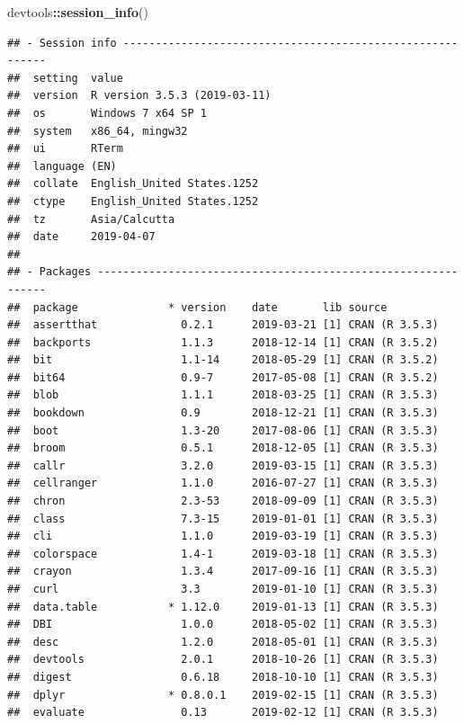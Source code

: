 \documentclass[12pt,openany]{book}
\newenvironment{Shaded}{\begin{snugshade}}{\end{snugshade}}
\newcommand{\KeywordTok}[1]{\textcolor[rgb]{0.13,0.29,0.53}{\textbf{#1}}}
\newcommand{\NormalTok}[1]{#1}
\newcommand{\OperatorTok}[1]{\textcolor[rgb]{0.81,0.36,0.00}{\textbf{#1}}}
\begin{document}
\begin{Shaded}
\begin{Highlighting}[]
\NormalTok{devtools}\OperatorTok{::}\KeywordTok{session_info}\NormalTok{()}
\end{Highlighting}
\end{Shaded}

\begin{verbatim}
## - Session info ----------------------------------------------------------
##  setting  value                       
##  version  R version 3.5.3 (2019-03-11)
##  os       Windows 7 x64 SP 1          
##  system   x86_64, mingw32             
##  ui       RTerm                       
##  language (EN)                        
##  collate  English_United States.1252  
##  ctype    English_United States.1252  
##  tz       Asia/Calcutta               
##  date     2019-04-07                  
## 
## - Packages --------------------------------------------------------------
##  package              * version    date       lib source        
##  assertthat             0.2.1      2019-03-21 [1] CRAN (R 3.5.3)
##  backports              1.1.3      2018-12-14 [1] CRAN (R 3.5.2)
##  bit                    1.1-14     2018-05-29 [1] CRAN (R 3.5.2)
##  bit64                  0.9-7      2017-05-08 [1] CRAN (R 3.5.2)
##  blob                   1.1.1      2018-03-25 [1] CRAN (R 3.5.3)
##  bookdown               0.9        2018-12-21 [1] CRAN (R 3.5.3)
##  boot                   1.3-20     2017-08-06 [1] CRAN (R 3.5.3)
##  broom                  0.5.1      2018-12-05 [1] CRAN (R 3.5.3)
##  callr                  3.2.0      2019-03-15 [1] CRAN (R 3.5.3)
##  cellranger             1.1.0      2016-07-27 [1] CRAN (R 3.5.3)
##  chron                  2.3-53     2018-09-09 [1] CRAN (R 3.5.3)
##  class                  7.3-15     2019-01-01 [1] CRAN (R 3.5.3)
##  cli                    1.1.0      2019-03-19 [1] CRAN (R 3.5.3)
##  colorspace             1.4-1      2019-03-18 [1] CRAN (R 3.5.3)
##  crayon                 1.3.4      2017-09-16 [1] CRAN (R 3.5.3)
##  curl                   3.3        2019-01-10 [1] CRAN (R 3.5.3)
##  data.table           * 1.12.0     2019-01-13 [1] CRAN (R 3.5.3)
##  DBI                    1.0.0      2018-05-02 [1] CRAN (R 3.5.3)
##  desc                   1.2.0      2018-05-01 [1] CRAN (R 3.5.3)
##  devtools               2.0.1      2018-10-26 [1] CRAN (R 3.5.3)
##  digest                 0.6.18     2018-10-10 [1] CRAN (R 3.5.3)
##  dplyr                * 0.8.0.1    2019-02-15 [1] CRAN (R 3.5.3)
##  evaluate               0.13       2019-02-12 [1] CRAN (R 3.5.3)

\end{verbatim}
\end{document}
